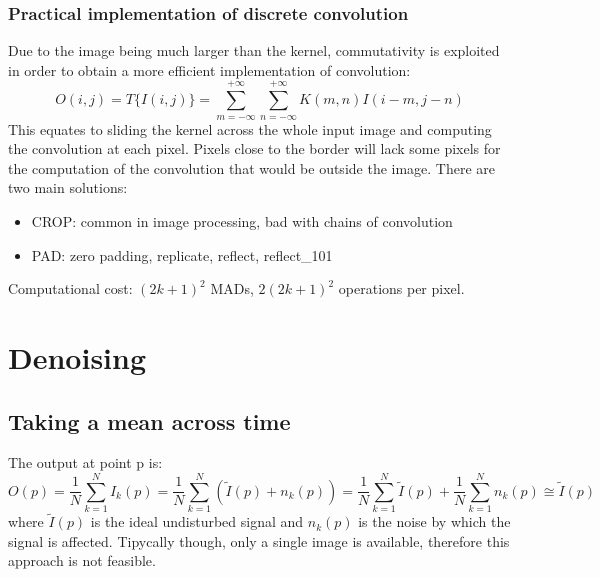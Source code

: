 \documentclass{article}
\begin{document}
\subsubsection{Practical implementation of discrete convolution}
Due to the image being much larger than the kernel, commutativity is exploited in order to obtain a more efficient implementation of convolution:
\begin{equation}
    O(i,j)=T\{I(i,j)\}=\sum_{m=-\infty}^{+\infty} \sum_{n=-\infty}^{+\infty} K(m,n)I(i-m,j-n)
\end{equation}
This equates to sliding the kernel across the whole input image and computing the convolution at each pixel. Pixels close to the border will lack some pixels for the computation of the convolution that would be outside the image. There are two main solutions:
\begin{itemize}
    \item CROP: common in image processing, bad with chains of convolution
    \item PAD: zero padding, replicate, reflect, reflect\_101
\end{itemize}
Computational cost: $(2k+1)^2$ MADs, $2(2k+1)^2$ operations per pixel.

\section{Denoising}
\subsection{Taking a mean across time}
The output at point p is:
\begin{equation}
    O(p)=\frac{1}{N} \sum_{k=1}^N I_k(p) = \frac{1}{N} \sum_{k=1}^N (\tilde{I}(p)+n_k(p)) = \frac{1}{N} \sum_{k=1}^N \tilde{I}(p) + \frac{1}{N} \sum_{k=1}^N n_k(p) \cong \tilde{I}(p)
\end{equation}
where $\tilde{I}(p)$ is the ideal undisturbed signal and $n_k(p)$ is the noise by which the signal is affected. Tipycally though, only a single image is available, therefore this approach is not feasible. 
\end{document}
